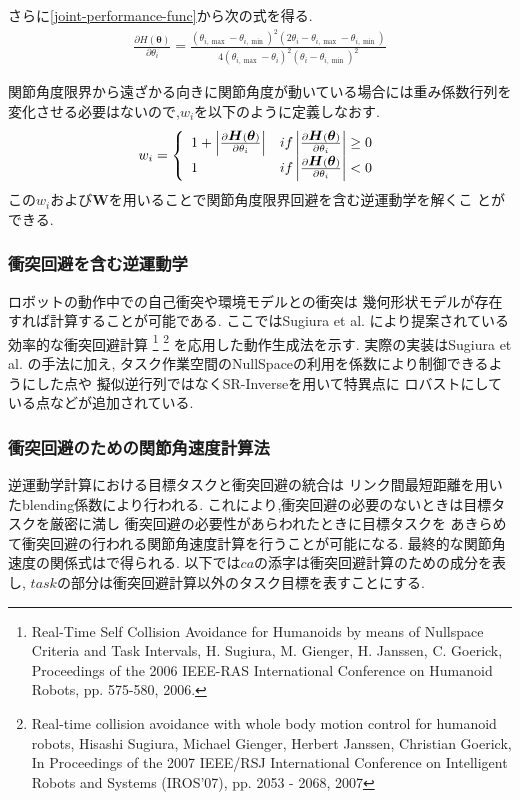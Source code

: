 さらに\eqref{joint-performance-func}から次の式を得る.
\begin{eqnarray}
 \frac{\partial H(\bm{\theta})}{\partial \theta_i}
  = \frac{(\theta_{i,\max} - \theta_{i,\min})^2(2\theta_i -
  \theta_{i,\max} - \theta_{i,\min})}
  {4(\theta_{i,\max} - \theta_i)^2(\theta_i - \theta_{i,\min})^2}
\end{eqnarray}

関節角度限界から遠ざかる向きに関節角度が動いている場合には重み係数行列を
変化させる必要はないので,$w_i$を以下のように定義しなおす.
\begin{eqnarray}
 w_i =
  \left\{
   \begin{array}{l l}
   1 + \left|\frac{\partial \mbox{\boldmath{$H$}}(\mbox{\boldmath{$\theta$}})}{\partial \theta_i}\right|
    & if \left|\frac{\partial \mbox{\boldmath{$H$}}(\mbox{\boldmath{$\theta$}})}{\partial
          \theta_i}\right| \geq 0 \\
    1 & if \left|\frac{\partial \mbox{\boldmath{$H$}}(\mbox{\boldmath{$\theta$}})}{\partial
          \theta_i}\right| < 0
    \end{array}
  \right.
\end{eqnarray}
この$w_i$および$\bm{W}$を用いることで関節角度限界回避を含む逆運動学を解くこ
とができる.

\subsubsection{衝突回避を含む逆運動学}
ロボットの動作中での自己衝突や環境モデルとの衝突は
幾何形状モデルが存在すれば計算することが可能である.
ここではSugiura et al. により提案されている効率的な衝突回避計算
\footnote{
Real-Time Self Collision Avoidance for Humanoids by means of
Nullspace Criteria and Task Intervals, 
H. Sugiura, M. Gienger, H. Janssen, C. Goerick,
Proceedings of the 2006 IEEE-RAS International Conference on Humanoid Robots,
pp. 575-580, 2006.
}
\footnote{
\label{WholebodyCollisionAvoidance:Sugiura:IROS07}
Real-time collision avoidance with whole body motion control for
humanoid robots,
Hisashi Sugiura, Michael Gienger, Herbert Janssen, Christian Goerick,
In Proceedings of the 2007 IEEE/RSJ International Conference on Intelligent Robots and Systems (IROS'07), pp. 2053 - 2068, 2007
}
を応用した動作生成法を示す.
実際の実装はSugiura et al. の手法に加え,
タスク作業空間のNullSpaceの利用を係数により制御できるようにした点や
擬似逆行列ではなくSR-Inverseを用いて特異点に
ロバストにしている点などが追加されている.

\subsubsection{衝突回避のための関節角速度計算法}
逆運動学計算における目標タスクと衝突回避の統合は
リンク間最短距離を用いたblending係数により行われる.
これにより,衝突回避の必要のないときは目標タスクを厳密に満し
衝突回避の必要性があらわれたときに目標タスクを
あきらめて衝突回避の行われる関節角速度計算を行うことが可能になる.
最終的な関節角速度の関係式はで得られる.
以下では$ca$の添字は衝突回避計算のための成分を表し,
$task$の部分は衝突回避計算以外のタスク目標を表すことにする.

